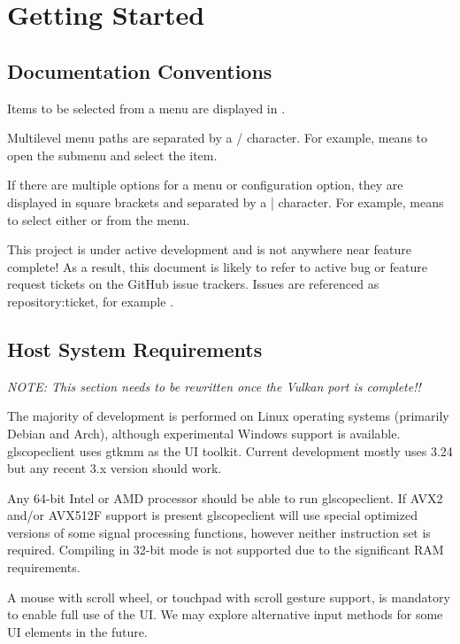 \chapter{Getting Started}

\section{Documentation Conventions}

Items to be selected from a menu are displayed in .

Multilevel menu paths are separated by a / character. For example,  means to open the
 submenu and select the  item.

If there are multiple options for a menu or configuration option, they are displayed in square brackets and separated
by a | character. For example,  means to select either
 or  from the 
menu.

This project is under active development and is not anywhere near feature complete! As a result, this document is
likely to refer to active bug or feature request tickets on the GitHub issue trackers. Issues are referenced as
repository:ticket, for example .

\section{Host System Requirements}

\emph{NOTE: This section needs to be rewritten once the Vulkan port is complete!!}

The majority of development is performed on Linux operating systems (primarily Debian and Arch), although experimental
Windows support is available. glscopeclient uses gtkmm as the UI toolkit. Current development mostly uses 3.24 but any
recent 3.x version should work.

Any 64-bit Intel or AMD processor should be able to run glscopeclient. If AVX2 and/or AVX512F support is present
glscopeclient will use special optimized versions of some signal processing functions, however neither instruction set
is required. Compiling in 32-bit mode is not supported due to the significant RAM requirements.

A mouse with scroll wheel, or touchpad with scroll gesture support, is mandatory to enable full use of the UI. We may
explore alternative input methods for some UI elements in the future.

